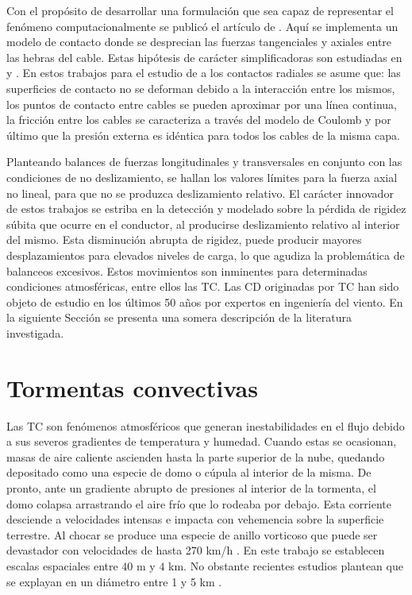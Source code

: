 Con el propósito de desarrollar una formulación que sea capaz de representar el fenómeno computacionalmente se publicó el artículo de \cite{Foti2016}. Aquí se implementa un modelo de contacto donde se desprecian las fuerzas tangenciales y axiales entre las hebras del cable. Estas hipótesis de carácter simplificadoras son estudiadas en \cite{costello1990average} y \cite{rawlins2005flexure}. En estos trabajos para el estudio de a los contactos radiales se asume que: las superficies de contacto no se deforman debido a la interacción entre los mismos, los puntos de contacto entre cables se pueden aproximar por una línea continua, la fricción entre los cables se caracteriza a través del modelo de Coulomb y por último que la presión externa es idéntica para todos los cables de la misma capa. 

Planteando balances de fuerzas longitudinales y transversales en conjunto con las condiciones de no deslizamiento, se hallan los valores límites para la fuerza axial no lineal, para que no se produzca deslizamiento relativo. El carácter innovador de estos trabajos se estriba en la detección y modelado sobre la pérdida de rigidez súbita que ocurre en el conductor, al producirse deslizamiento relativo al interior del mismo. Esta disminución abrupta de rigidez, puede producir mayores desplazamientos para elevados niveles de carga, lo que agudiza la problemática de balanceos excesivos. Estos movimientos son inminentes para determinadas condiciones atmosféricas, entre ellos las TC. Las CD originadas por TC han sido objeto de estudio en los últimos 50 años por expertos en ingeniería del viento. En la siguiente Sección se presenta una somera descripción de la literatura investigada. 

\section{Tormentas convectivas}\label{Sec:EA:TormentasConvectivas}

Las TC son fenómenos atmosféricos que generan inestabilidades en el flujo debido a sus severos gradientes de temperatura y humedad. Cuando estas se ocasionan, masas de aire caliente ascienden hasta la parte superior de la nube, quedando depositado como una especie de domo o cúpula al interior de la misma. De pronto, ante un gradiente abrupto de presiones al interior de la tormenta, el domo colapsa arrastrando el aire frío que lo rodeaba por debajo. Esta corriente desciende a velocidades intensas e impacta con vehemencia sobre la superficie terrestre. Al chocar se produce una especie de anillo vorticoso que puede ser devastador con velocidades de hasta 270 km/h \textcite{fujita1985downburst}. En este trabajo se establecen escalas espaciales entre $40$ m  y $4$ km. No obstante recientes estudios plantean que se explayan en un diámetro entre 1 y 5 km \textcite{darwish2010dynamic}.

